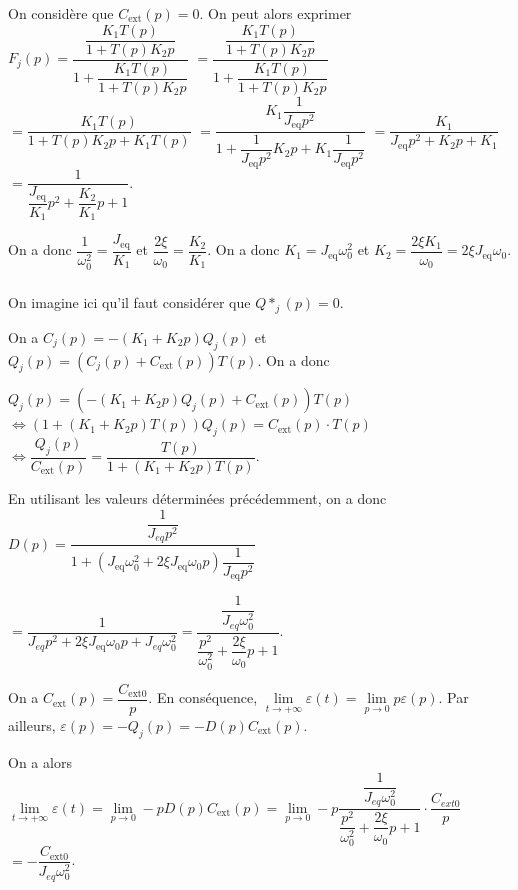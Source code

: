 \documentclass[10pt,fleqn]{article} %
\begin{document}
On considère que $C_{\text{ext}}(p)=0$.  On peut alors exprimer 
$F_j(p)= \dfrac{\dfrac{K_1T(p)}{1+T(p)K_2 p} }{1+\dfrac{K_1T(p)}{1+T(p)K_2 p}}$
$= \dfrac{\dfrac{K_1T(p)}{1+T(p)K_2 p} }{1+\dfrac{K_1T(p)}{1+T(p)K_2 p}}$
$= \dfrac{K_1T(p) }{1+T(p)K_2 p+K_1T(p)}$
$= \dfrac{K_1\dfrac{1}{J_{\text{eq}}p^2}}{1+\dfrac{1}{J_{\text{eq}}p^2}K_2 p+K_1\dfrac{1}{J_{\text{eq}}p^2}}$
$= \dfrac{K_1}{J_{\text{eq}}p^2+K_2 p+K_1}$
$= \dfrac{1}{\dfrac{J_{\text{eq}}}{K_1}p^2+\dfrac{K_2}{K_1}p+1}$.

On a donc $\dfrac{1}{\omega_0^2}=\dfrac{J_{\text{eq}}}{K_1}$ et $\dfrac{2\xi}{\omega_0}=\dfrac{K_2}{K_1}$. On a donc $K_1=J_{\text{eq}}\omega_0^2$ et $K_2=\dfrac{2\xi K_1}{\omega_0}=2\xi J_{\text{eq}}\omega_0$.

\subparagraph{}%
On imagine ici qu'il faut considérer que $Q*_j(p)=0$.

On a $C_j(p)=-\left(K_1+K_2 p\right) Q_j(p)$ et $Q_j(p)=\left(C_j(p)+C_{\text{ext}}(p)\right)T(p)$.  On a donc  



$Q_j(p)=\left(-\left(K_1+K_2 p\right) Q_j(p)+C_{\text{ext}}(p)\right)T(p)$
$\Leftrightarrow \left(1+\left(K_1+K_2 p\right)T(p) \right)Q_j(p)=C_{\text{ext}}(p)\cdot T(p)$
$\Leftrightarrow \dfrac{Q_j(p)}{C_{\text{ext}}(p)}=\dfrac{T(p)}{1+\left(K_1+K_2 p\right)T(p) }$.

En utilisant les valeurs déterminées précédemment, on a donc $D(p)=\dfrac{\dfrac{1}{J_{eq}p^2}}{1+\left(J_{\text{eq}}\omega_0^2+2\xi J_{\text{eq}}\omega_0 p\right)\dfrac{1}{J_{\text{eq}}p^2} }$

$=\dfrac{1}{J_{eq}p^2+2\xi J_{\text{eq}}\omega_0 p+J_{eq}\omega_0^2}=\dfrac{\dfrac{1}{J_{eq}\omega_0^2}}{\dfrac{p^2}{\omega_0^2}+\dfrac{2\xi}{\omega_0}p+1}$.

On a $C_{\text{ext}}(p)=\dfrac{C_{\text{ext} 0}}{p}$. En conséquence, 
$\lim\limits_{t\to +\infty} \varepsilon(t) = \lim\limits_{p\to 0} p\varepsilon(p)$.
Par ailleurs,  $\varepsilon(p)=-Q_j(p)=-D(p)C_{\text{ext}}(p)$.

On a alors $\lim\limits_{t\to +\infty} \varepsilon(t) = \lim\limits_{p\to 0} -pD(p)C_{\text{ext}}(p)= \lim\limits_{p\to 0} -p\dfrac{\dfrac{1}{J_{eq}\omega_0^2}}{\dfrac{p^2}{\omega_0^2}+\dfrac{2\xi}{\omega_0}p+1}\cdot \dfrac{C_{ext0}}{p}$
$=  -\dfrac{C_{\text{ext} 0}}{J_{eq}\omega_0^2}$.
\end{document}
